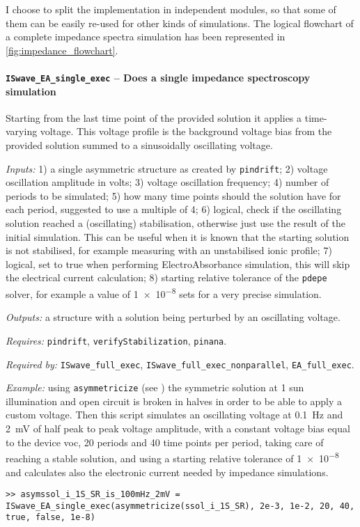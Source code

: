 	I choose to split the implementation in independent modules, so that some of them can be easily re-used for other kinds of simulations.
	The logical flowchart of a complete impedance spectra simulation has been represented in \cref{fig:impedance_flowchart}.


	\paragraph{\texttt{IS\-wave\_EA\_single\_exec} -- Does a single impedance spectroscopy simulation}
	Starting from the last time point of the provided solution it applies a time-varying voltage.
	This voltage profile is the background voltage bias from the provided solution summed to a sinusoidally oscillating voltage.

	\textit{Inputs:} 1) a single asymmetric structure as created by \texttt{pin\-drift};
	2) voltage oscillation amplitude in volts;
	3) voltage oscillation frequency;
	4) number of periods to be simulated;
	5) how many time points should the solution have for
	each period, suggested to use a multiple of 4;
	6) logical, check if the oscillating solution reached a
	(oscillating) stabilisation, otherwise just use the result of the
	initial simulation. This can be useful when it is known that the
	starting solution is not stabilised, for example measuring with an
	unstabilised ionic profile;
	7) logical, set to true when performing ElectroAbsorbance simulation,
	this will skip the electrical current calculation;
	8) starting relative tolerance of the \texttt{pdepe} solver, for example a
	value of \num{1e-8} sets for a very precise simulation.

	\textit{Outputs:} a structure with a solution being perturbed by an
	oscillating voltage.

	\textit{Requires:} \texttt{pin\-drift}, \texttt{verify\-Stabilization}, \texttt{pinana}.

	\textit{Required by:} \texttt{IS\-wave\_full\_exec}, \texttt{IS\-wave\_full\_exec\_nonparallel}, \texttt{EA\_full\_exec}.

	\textit{Example:} using \texttt{asymmetricize} (see ) the symmetric solution at 1 sun illumination and open circuit is broken in halves in order to be able to apply a custom voltage.
	Then this script simulates an oscillating voltage at \SI{0.1}{\Hz} and \SI{2}{\mV} of half peak to peak voltage amplitude, with a constant voltage bias equal to the device \gls{voc},
	20 periods and 40 time points per period, taking care of reaching a stable solution,
	and using a starting relative tolerance of \num{1e-8} and calculates also the electronic current needed by impedance simulations.
	\begin{lstlisting}[style=Matlab-editor]
>> asymssol_i_1S_SR_is_100mHz_2mV = ISwave_EA_single_exec(asymmetricize(ssol_i_1S_SR), 2e-3, 1e-2, 20, 40, true, false, 1e-8)
   \end{lstlisting}

